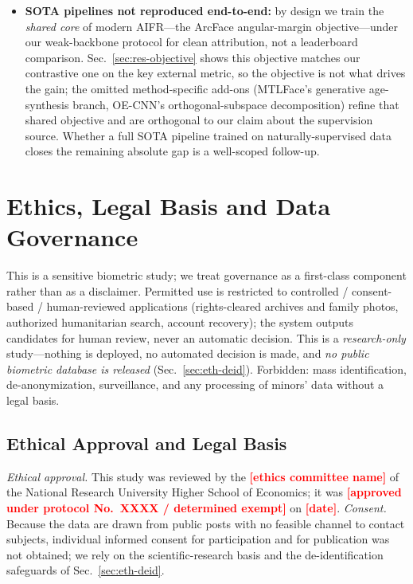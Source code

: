 \documentclass[journal]{IEEEtran}
\newcommand{\fillin}[1]{\textcolor{red}{\textbf{[#1]}}}
\begin{document}
\begin{itemize}[leftmargin=1.2em]
\item \textbf{SOTA pipelines not reproduced end-to-end:} by design we train the \emph{shared core} of modern AIFR---the ArcFace angular-margin objective---under our weak-backbone protocol for clean attribution, not a leaderboard comparison. Sec.~\ref{sec:res-objective} shows this objective matches our contrastive one on the key external metric, so the objective is not what drives the gain; the omitted method-specific add-ons (MTLFace's generative age-synthesis branch, OE-CNN's orthogonal-subspace decomposition) refine that shared objective and are orthogonal to our claim about the supervision source. Whether a full SOTA pipeline trained on naturally-supervised data closes the remaining absolute gap is a well-scoped follow-up.
\end{itemize}

\section{Ethics, Legal Basis and Data Governance}\label{sec:ethics}
This is a sensitive biometric study; we treat governance as a first-class component rather than as a disclaimer. Permitted use is restricted to controlled / consent-based / human-reviewed applications (rights-cleared archives and family photos, authorized humanitarian search, account recovery); the system outputs candidates for human review, never an automatic decision. This is a \emph{research-only} study---nothing is deployed, no automated decision is made, and \emph{no public biometric database is released} (Sec.~\ref{sec:eth-deid}). Forbidden: mass identification, de-anonymization, surveillance, and any processing of minors' data without a legal basis.

\subsection{Ethical Approval and Legal Basis}\label{sec:eth-legal}
\emph{Ethical approval.} This study was reviewed by the \fillin{ethics committee name} of the National Research University Higher School of Economics; it was \fillin{approved under protocol No.\ XXXX / determined exempt} on \fillin{date}. \emph{Consent.} Because the data are drawn from public posts with no feasible channel to contact subjects, individual informed consent for participation and for publication was not obtained; we rely on the scientific-research basis and the de-identification safeguards of Sec.~\ref{sec:eth-deid}.
\end{document}
